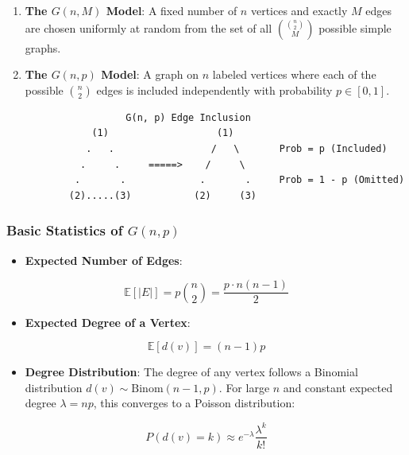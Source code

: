 \documentclass[
]{book}
\providecommand{\tightlist}{%
  \setlength{\itemsep}{0pt}\setlength{\parskip}{0pt}}
\theoremstyle{definition}
\theoremstyle{definition}
\theoremstyle{definition}
\theoremstyle{definition}
\theoremstyle{remark}
\begin{document}
\begin{enumerate}
\def\labelenumi{\arabic{enumi}.}
\tightlist
\item
  \textbf{The \(G(n, M)\) Model}:
  A fixed number of \(n\) vertices and exactly \(M\) edges are chosen uniformly at random from the set of all \(\binom{\binom{n}{2}}{M}\) possible simple graphs.
\item
  \textbf{The \(G(n, p)\) Model}:
  A graph on \(n\) labeled vertices where each of the possible \(\binom{n}{2}\) edges is included independently with probability \(p \in [0, 1]\).
\end{enumerate}

\begin{verbatim}
                     G(n, p) Edge Inclusion
               (1)                   (1)
              .   .                 /   \       Prob = p (Included)
             .     .     =====>    /     \      
            .       .             .       .     Prob = 1 - p (Omitted)
           (2).....(3)           (2)     (3)
\end{verbatim}

\subsubsection{\texorpdfstring{Basic Statistics of \(G(n, p)\)}{Basic Statistics of G(n, p)}}\label{basic-statistics-of-gn-p}

\begin{itemize}
\tightlist
\item
  \textbf{Expected Number of Edges}:
\end{itemize}

\[\mathbb{E}[\vert{}E\vert{}] = p \binom{n}{2} = \frac{p \cdot n(n-1)}{2}\]

\begin{itemize}
\tightlist
\item
  \textbf{Expected Degree of a Vertex}:
\end{itemize}

\[\mathbb{E}[d(v)] = (n - 1)p\]

\begin{itemize}
\tightlist
\item
  \textbf{Degree Distribution}: The degree of any vertex follows a Binomial distribution \(d(v) \sim \text{Binom}(n - 1, p)\). For large \(n\) and constant expected degree \(\lambda = np\), this converges to a Poisson distribution:
\end{itemize}

\[P(d(v) = k) \approx e^{-\lambda} \frac{\lambda^k}{k!}\]
\end{document}
